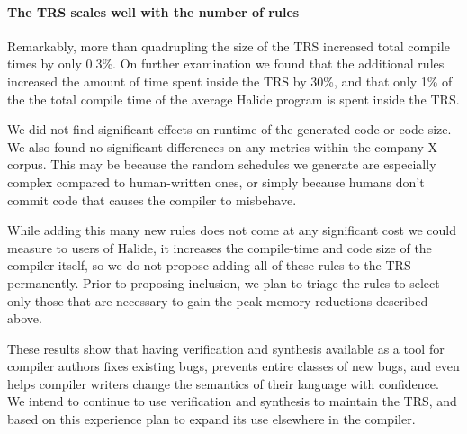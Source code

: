 \documentclass[acmsmall,review,anonymous]{acmart}\settopmatter{printfolios=true,printccs=false,printacmref=false}
\newcommand{\hmax}[0]{\texttt{max}}
\newcommand{\hmin}[0]{\texttt{min}}
\newcommand{\rewrites}[0]{\:\rightarrow_{R}\:}
\begin{document}
\paragraph{The TRS scales well with the number of rules}
Remarkably, more than quadrupling the size of the TRS increased total compile
times by only 0.3\%. On further examination we found that the
additional rules increased the amount of time spent inside the TRS by
30\%, and that only 1\% of the the total compile time of the average
Halide program is spent inside the TRS.

We did not find significant effects on runtime of the generated code or code size. We also found no significant differences on any metrics within the company X corpus. This may be because the random schedules we generate are especially complex compared to human-written ones, or simply because humans don’t commit code that causes the compiler to misbehave.

While adding this many new rules does not come at any significant cost we could measure to users of Halide, it increases the compile-time and code size of the compiler itself, so we do not propose adding all of these rules to the TRS permanently. Prior to proposing inclusion, we plan to triage the rules to select only those that are necessary to gain the peak memory reductions described above.

These results show that having verification and synthesis available as a tool for compiler authors fixes existing bugs, prevents entire classes of new bugs, and even helps compiler writers change the semantics of their language with confidence. We intend to continue to use verification and synthesis to maintain the TRS, and based on this experience plan to expand its use elsewhere in the compiler.





\end{document}
